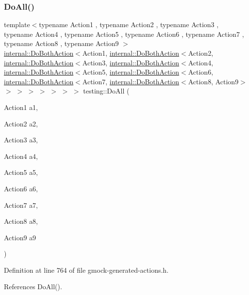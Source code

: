 \subsubsection{\texorpdfstring{Do\+All()}{DoAll()}\hspace{0.1cm}{\footnotesize\ttfamily [8/9]}}
{\footnotesize\ttfamily template$<$typename Action1 , typename Action2 , typename Action3 , typename Action4 , typename Action5 , typename Action6 , typename Action7 , typename Action8 , typename Action9 $>$ \\
\hyperlink{classtesting_1_1internal_1_1DoBothAction}{internal\+::\+Do\+Both\+Action}$<$Action1, \hyperlink{classtesting_1_1internal_1_1DoBothAction}{internal\+::\+Do\+Both\+Action}$<$Action2, \hyperlink{classtesting_1_1internal_1_1DoBothAction}{internal\+::\+Do\+Both\+Action}$<$Action3, \hyperlink{classtesting_1_1internal_1_1DoBothAction}{internal\+::\+Do\+Both\+Action}$<$Action4, \hyperlink{classtesting_1_1internal_1_1DoBothAction}{internal\+::\+Do\+Both\+Action}$<$Action5, \hyperlink{classtesting_1_1internal_1_1DoBothAction}{internal\+::\+Do\+Both\+Action}$<$Action6, \hyperlink{classtesting_1_1internal_1_1DoBothAction}{internal\+::\+Do\+Both\+Action}$<$Action7, \hyperlink{classtesting_1_1internal_1_1DoBothAction}{internal\+::\+Do\+Both\+Action}$<$Action8, Action9$>$ $>$ $>$ $>$ $>$ $>$ $>$ $>$ testing\+::\+Do\+All (\begin{DoxyParamCaption}\item[{Action1}]{a1,  }\item[{Action2}]{a2,  }\item[{Action3}]{a3,  }\item[{Action4}]{a4,  }\item[{Action5}]{a5,  }\item[{Action6}]{a6,  }\item[{Action7}]{a7,  }\item[{Action8}]{a8,  }\item[{Action9}]{a9 }\end{DoxyParamCaption})\hspace{0.3cm}{\ttfamily [inline]}}



Definition at line 764 of file gmock-\/generated-\/actions.\+h.



References Do\+All().



